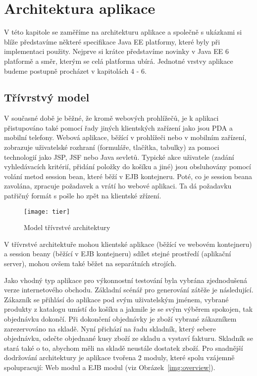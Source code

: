 \documentclass[122pt,oneside]{fithesis}
\begin{document}
\chapter{Architektura aplikace}
V této kapitole se zaměříme na architekturu aplikace a společně s ukázkami si blíže představíme některé specifikace Java EE platformy, které byly při implementaci použity. Nejprve si krátce představíme novinky v Java EE 6 platformě a směr, kterým se celá platforma ubírá. Jednotné vrstvy aplikace budeme postupně procházet v kapitolách 4 - 6.

\section{Třívrstvý model}
V současné době je běžné, že kromě webových prohlížečů, je k aplikaci přistupováno také pomocí řady jiných klientských zařízení jako jsou PDA a mobilní telefony. Webová aplikace, běžící v prohlížeči nebo v mobilním zařízení, zobrazuje uživatelské rozhraní (formuláře, tlačítka, tabulky) za pomoci technologií jako JSP, JSF nebo Java sevletů. Typické akce uživatele (zadání vyhledávacích kritérií, přidání položky do košíku a jiné) jsou obsluhovány pomocí volání metod session bean, které běží v EJB kontejneru. Poté, co je session beana zavolána, zpracuje požadavek a vrátí ho webové aplikaci. Ta dá požadavku patřičný formát s pošle ho zpět na klientské zřízení.

\begin{figure}[!ht]
\centering
\texttt{[image: tier]}
\caption{Model třívrstvé architektury~\cite{kodali06}}
\label{img:tier}
\end{figure}

V třívrstvé architektuře mohou klientské aplikace (běžící ve webovém kontejneru) a session beany (běžící v EJB kontejneru) sdílet stejné prostředí (aplikační server), mohou ovšem také běžet na separátních strojích.

Jako vhodný typ aplikace pro výkonnostní testování byla vybrána zjednodušená verze internetového obchodu. Základní scénář pro generování zátěže je následující. Zákazník se přihlásí do aplikace pod svým uživatelským jménem, vybrané produkty z katalogu umístí do košíku a jakmile je se svým výběrem spokojen, tak objednávku dokončí. Při dokončení objednávky je zboží vybrané zákazníkem zarezervováno na skladě. Nyní přichází na řadu skladník, který sebere objednávku, odečte objednané kusy zboží ze skladu a vystaví fakturu. Skladník se stará také o to, abychom měli na skladě neustále dostatek zboží. Pro snadnější dodržování architektury je aplikace tvořena 2 moduly, které spolu vzájemně spolupracují: Web modul a EJB modul (viz Obrázek~\ref{img:overview}).
\end{document}
